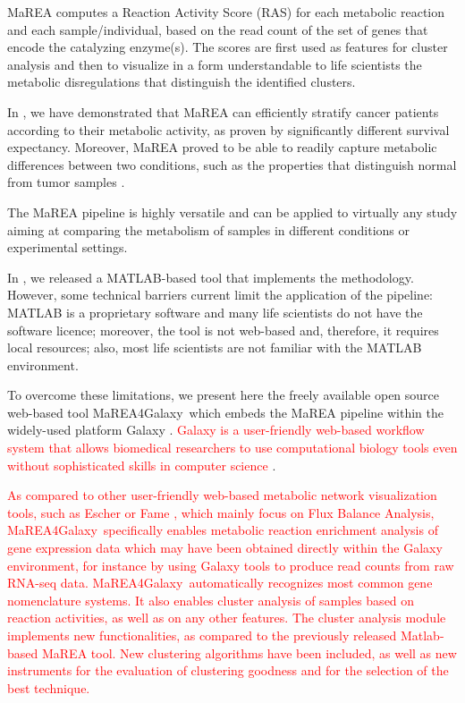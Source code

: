 \documentclass[preprint,12pt,authoryear]{elsarticle}
\newcommand{\red}{\textcolor{red}}
\newcommand{\mareagalaxy}{\textsf{MaREA4Galaxy}}
\begin{document}
\textsf{MaREA} computes a Reaction Activity Score (RAS) for each
metabolic reaction and each sample/individual, based on the read count
of the set of genes that encode the catalyzing enzyme(s).
%
The scores are first used as features for cluster analysis and then to
visualize in a form understandable to life scientists the metabolic
disregulations that distinguish the identified clusters.

In \citep{marea}, we have demonstrated that \textsf{MaREA} can
efficiently stratify cancer patients according to their metabolic
activity, as proven by significantly different survival expectancy.
%
Moreover, \textsf{MaREA} proved to be able to readily capture
metabolic differences between two conditions, such as the properties
that distinguish normal from tumor samples \citep{marea}.

The \textsf{MaREA} pipeline is highly versatile and can be applied to
virtually any study aiming at comparing the metabolism of samples in
different conditions or experimental settings.

In \citep{marea}, we released a MATLAB-based tool that implements the
methodology. However, some technical barriers current limit the
application of the pipeline: MATLAB is a proprietary software and many
life scientists do not have the software licence; moreover, the tool
is not web-based and, therefore, it requires local resources; also,
most life scientists are not familiar with the MATLAB environment.

To overcome these limitations, we present here the freely available
open source web-based tool \mareagalaxy\ which embeds the
\textsf{MaREA} pipeline within the widely-used platform Galaxy
\citep{galaxy}.
%
\textcolor{red}{Galaxy is a user-friendly web-based workflow system
  that allows biomedical researchers to use computational biology
  tools even without sophisticated skills in  computer science}
\citep{galaxy}.

\red{As compared to other user-friendly web-based metabolic network
  visualization tools, such as Escher \citep{king2015escher} or Fame
  \citep{boele2012fame}, which mainly focus on Flux Balance Analysis,
  \mareagalaxy\ specifically enables metabolic reaction enrichment
  analysis of gene expression data which may have been obtained
  directly within the Galaxy environment, for instance by using Galaxy
  tools to produce read counts from raw RNA-seq data. \mareagalaxy\
  automatically recognizes most common gene nomenclature systems.
  It also enables cluster analysis of samples based on reaction
  activities, as well as on any other features. The cluster analysis
  module implements new functionalities, as compared to the previously
  released Matlab-based \textsf{MaREA} tool. New clustering algorithms
  have been included, as well as new instruments for the evaluation of
  clustering goodness and for the selection of the best technique.}
\end{document}
